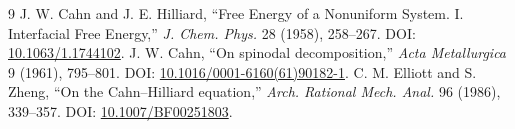 \documentclass[10pt]{article}
\begin{document}
\begin{thebibliography}{9}
 J. W. Cahn and J. E. Hilliard,
``Free Energy of a Nonuniform System. I. Interfacial Free Energy,''
\emph{J. Chem. Phys.} 28 (1958), 258--267.
DOI: \href{https://doi.org/10.1063/1.1744102}{10.1063/1.1744102}.
 J. W. Cahn, ``On spinodal decomposition,''
\emph{Acta Metallurgica} 9 (1961), 795--801.
DOI: \href{https://doi.org/10.1016/0001-6160(61)90182-1}{10.1016/0001-6160(61)90182-1}.
 C. M. Elliott and S. Zheng, ``On the Cahn--Hilliard
equation,'' \emph{Arch. Rational Mech. Anal.} 96 (1986), 339--357.
DOI: \href{https://doi.org/10.1007/BF00251803}{10.1007/BF00251803}.
\end{thebibliography}
\end{document}
